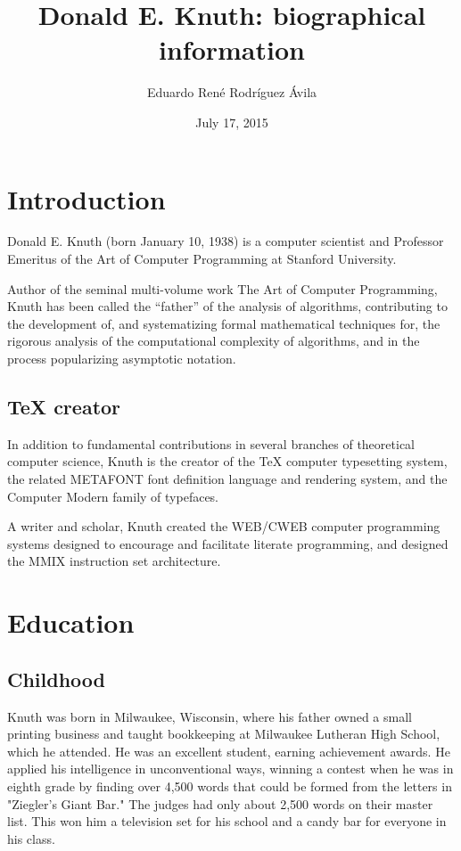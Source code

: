 \documentclass[10pt,letterpaper]{article}
\title{Donald E. Knuth: biographical information}
\author{Eduardo René Rodríguez Ávila}
\date{July 17, 2015}
\begin{document}
\maketitle
\tableofcontents

\section{Introduction}

Donald E. Knuth (born January 10, 1938) is a computer scientist 
and Professor Emeritus of the Art of Computer Programming at 
Stanford University.

Author of the seminal multi-volume work The Art of Computer Programming, 
Knuth has been called the ``father'' of the analysis of algorithms, 
contributing to the development of, and systematizing formal mathematical 
techniques for, the rigorous analysis of the computational complexity of 
algorithms, and in the process popularizing asymptotic notation.

\subsection{TeX creator}

In addition to fundamental contributions in several branches of theoretical 
computer science, Knuth is the creator of the TeX computer typesetting 
system, the related METAFONT font definition language and rendering system, 
and the Computer Modern family of typefaces.

A writer and scholar, Knuth created the WEB/CWEB computer programming 
systems designed to encourage and facilitate literate programming, 
and designed the MMIX instruction set architecture.

\section{Education}

\subsection{Childhood}

Knuth was born in Milwaukee, Wisconsin, where his father owned a small 
printing business and taught bookkeeping at Milwaukee Lutheran High 
School, which he attended. He was an excellent student, earning achievement 
awards. He applied his intelligence in unconventional ways, winning a contest 
when he was in eighth grade by finding over 4,500 words that could be formed 
from the letters in "Ziegler's Giant Bar." The judges had only about 
2,500 words on their master list. This won him a television set for his school 
and a candy bar for everyone in his class.
\end{document}
